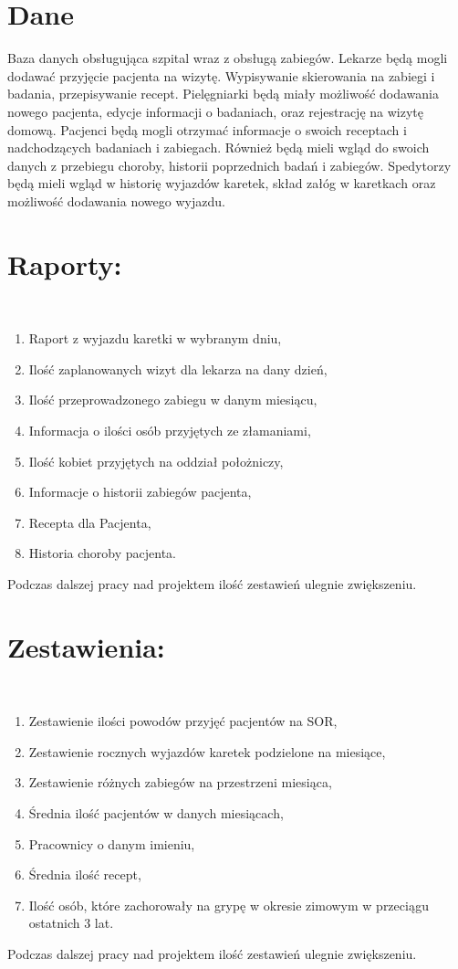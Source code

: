 \section*{Dane}
\par{
Baza danych obsługująca szpital wraz z obsługą zabiegów. Lekarze będą mogli dodawać przyjęcie pacjenta na wizytę. Wypisywanie skierowania na zabiegi i badania, przepisywanie recept. Pielęgniarki będą miały możliwość dodawania nowego pacjenta, edycje informacji o badaniach, oraz rejestrację na wizytę domową. Pacjenci będą mogli otrzymać informacje o swoich receptach i nadchodzących badaniach i zabiegach. Również będą mieli wgląd do swoich danych z przebiegu choroby, historii poprzednich badań i zabiegów. Spedytorzy będą mieli wgląd w historię wyjazdów karetek, skład załóg w karetkach oraz możliwość dodawania nowego wyjazdu.
}
\section*{Raporty:}\\
\begin{enumerate}
\itemsep-5pt
\item Raport z wyjazdu karetki w wybranym dniu,
\item Ilość zaplanowanych wizyt dla lekarza na dany dzień,
\item Ilość przeprowadzonego zabiegu w danym miesiącu,
\item Informacja o ilości osób przyjętych ze złamaniami,
\item Ilość kobiet przyjętych na oddział położniczy,
\item Informacje o historii zabiegów pacjenta,
\item Recepta dla Pacjenta,
\item Historia choroby pacjenta.

\end{enumerate}
Podczas dalszej pracy nad projektem ilość zestawień ulegnie zwiększeniu.

\section*{Zestawienia:}\\
    \begin{enumerate}
        \itemsep-5pt
\item Zestawienie ilości powodów przyjęć pacjentów na SOR,
\item Zestawienie rocznych wyjazdów karetek podzielone na miesiące,
\item Zestawienie różnych zabiegów na przestrzeni miesiąca,
\item Średnia ilość pacjentów w danych miesiącach,
\item Pracownicy o danym imieniu,
\item Średnia ilość recept,
\item Ilość osób, które zachorowały na grypę w okresie zimowym w przeciągu ostatnich 3 lat.
\end{enumerate}
Podczas dalszej pracy nad projektem ilość zestawień ulegnie zwiększeniu.